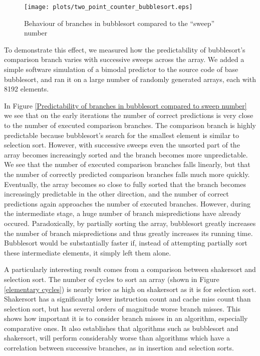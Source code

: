 \begin{figure}
\texttt{[image: plots/two\_point\_counter\_bubblesort.eps]}
\caption{Behaviour of branches in bubblesort compared to the ``sweep'' number}
\label{Predictability of branches in bubblesort compared to sweep number}
\end{figure}

To demonstrate this effect, we measured how the predictability of bubblesort's
comparison branch varies with successive sweeps across the array. We added a
simple software simulation of a bimodal predictor to the source code of base
bubblesort, and ran it on a large number of randomly generated arrays, each with
8192 elements.

In Figure \ref{Predictability of branches in bubblesort compared to sweep
number} we see that on the early iterations the number of correct predictions is
very close to the number of executed comparison branches. The comparison branch
is highly predictable because bubblesort's search for the smallest element is
similar to selection sort. However, with successive sweeps even the unsorted
part of the array becomes increasingly sorted and the branch becomes more
unpredictable. We see that the number of executed comparison branches falls
linearly, but that the number of correctly predicted comparison branches falls
much more quickly. Eventually, the array becomes so close to fully sorted that
the branch becomes increasingly predictable in the other direction, and the
number of correct predictions again approaches the number of executed branches.
However, during the intermediate stage, a huge number of branch mispredictions
have already occured. Paradoxically, by partially sorting the array, bubblesort
greatly increases the number of branch mispredictions and thus greatly increases
its running time. Bubblesort would be substantially faster if, instead of
attempting partially sort these intermediate elements, it simply left them
alone.

A particularly interesting result comes from a comparison between shakersort and
selection sort. The number of cycles to sort an array (shown in Figure
\ref{elementary cycles}) is nearly twice as high on shakersort as it is for
selection sort. Shakersort has a significantly lower instruction count and cache
miss count than selection sort, but has several orders of magnitude worse branch
misses. This shows how important it is to consider branch misses in an
algorithm, especially comparative ones. It also establishes that algorithms such
as bubblesort and shakersort, will perform considerably worse than algorithms
which have a correlation between successive branches, as in insertion and
selection sorts.


